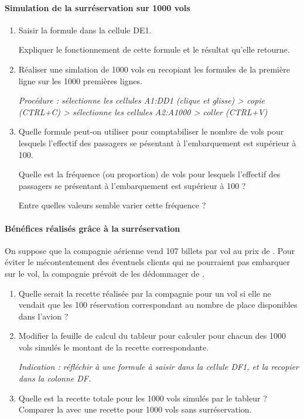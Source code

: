 \documentclass[main.tex]{subfiles}
\begin{document}
\paragraph{Simulation de la surréservation sur 1000 vols}
\begin{enumerate}[label=\alph*),leftmargin=*]
	\item Saisir la formule  dans la cellule {\helvbx DE1}.
	
	Expliquer le fonctionnement de cette formule et le résultat qu'elle retourne.
	 
	\item Réaliser une simlation de 1000 vols en recopiant les formules de la première ligne sur les 1000 premières lignes.
	
	\emph{Procédure : sélectionne les cellules { \helvbx A1:DD1}  (clique et glisse) > copie  (CTRL+C) > sélectionne les cellules { \helvbx A2:A1000} > coller (CTRL+V)}
	
	\item Quelle formule peut-on utiliser pour comptabiliser le nombre de vols pour lesquels l'effectif des passagers se  pésentant à l'embarquement est supérieur à 100.
	
	Quelle est la fréquence (ou proportion) de vols pour lesquels l'effectif des passagers se présentant à l'embarquement est supérieur à 100 ?
	
	Entre quelles valeurs semble varier cette fréquence ?
	
\end{enumerate}
\paragraph{Bénéfices réalisés grâce à la surréservation} On suppose que la compagnie aérienne vend 107 billets par vol au prix de . Pour éviter le mécontentement des éventuels clients qui ne pourraient pas embarquer sur le vol, la compagnie prévoit de  les dédommager de .
\begin{enumerate}[label=\alph*),leftmargin=*]
	\item Quelle serait la recette réalisée par la compagnie pour un vol si elle ne vendait que les 100 réservation correspondant au nombre de place disponibles dans l'avion ? 
	\item Modifier la feuille de calcul du tableur pour calculer pour chacun des 1000 vols simulés le montant de la recette correspondante.
	
	\emph{Indication : réfléchir à une formule à saisir dans la cellule {\helvbx DF1}, et la recopier dans la colonne {\helvbx DF}.}
	\item Quelle est la recette totale pour les 1000 vols simulés par le tableur ? Comparer la avec une recette pour 1000 vols sans surréservation.
\end{enumerate}
\end{document}
